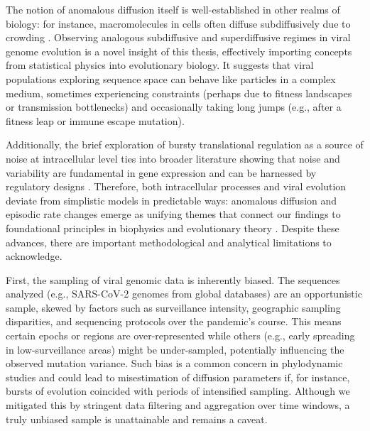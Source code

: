 The notion of anomalous diffusion itself is well-established in other realms of biology: for instance, macromolecules in cells often diffuse subdiffusively due to crowding \cite{Weiss2004,Hofling2013}. Observing analogous subdiffusive and superdiffusive regimes in viral genome evolution is a novel insight of this thesis, effectively importing concepts from statistical physics into evolutionary biology. It suggests that viral populations exploring sequence space can behave like particles in a complex medium, sometimes experiencing constraints (perhaps due to fitness landscapes or transmission bottlenecks) and occasionally taking long jumps (e.g., after a fitness leap or immune escape mutation). 

Additionally, the brief exploration of bursty translational regulation as a source of noise at intracellular level ties into broader literature showing that noise and variability are fundamental in gene expression and can be harnessed by regulatory designs \cite{Paulsson2004}. Therefore, both intracellular processes and viral evolution deviate from simplistic models in predictable ways: anomalous diffusion and episodic rate changes emerge as unifying themes that connect our findings to foundational principles in biophysics and evolutionary theory \cite{kimura1968,Ho2011}. Despite these advances, there are important methodological and analytical limitations to acknowledge.

First, the sampling of viral genomic data is inherently biased. The sequences analyzed (e.g., SARS-CoV-2 genomes from global databases) are an opportunistic sample, skewed by factors such as surveillance intensity, geographic sampling disparities, and sequencing protocols over the pandemic's course. This means certain epochs or regions are over-represented while others (e.g., early spreading in low-surveillance areas) might be under-sampled, potentially influencing the observed mutation variance. Such bias is a common concern in phylodynamic studies and could lead to misestimation of diffusion parameters if, for instance, bursts of evolution coincided with periods of intensified sampling. Although we mitigated this by stringent data filtering and aggregation over time windows, a truly unbiased sample is unattainable and remains a caveat.

